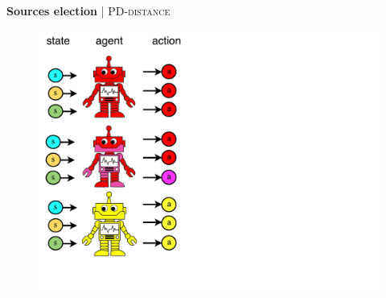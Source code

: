 \documentclass[french]{beamer}
\begin{document}
    \begin{frame}{\textbf{Sources election} | \textsc{PD-distance}}
        \begin{figure}
            \begin{center}
                \includegraphics[width=1.0\textwidth]{img/pddistance0.pdf}
            \end{center}
        \end{figure}
    \end{frame}
\end{document}
